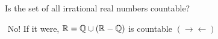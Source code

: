 Is the set of all irrational real numbers countable?



\begin{tcolorbox}
	\begin{solution}$ $
		No! If it were, $\mathbb{R} = \mathbb{Q} \cup (\mathbb{R} - \mathbb{Q})$ is countable $(\rightarrow\leftarrow)$
	\end{solution}
\end{tcolorbox}